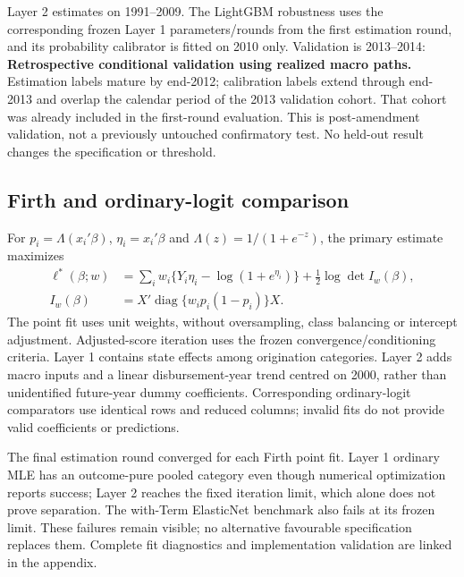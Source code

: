 Layer 2 estimates on 1991--2009. The LightGBM robustness uses the corresponding frozen Layer 1 parameters/rounds from the first estimation round, and its probability calibrator is fitted on 2010 only. Validation is 2013--2014: \textbf{Retrospective conditional validation using realized macro paths.} Estimation labels mature by end-2012; calibration labels extend through end-2013 and overlap the calendar period of the 2013 validation cohort. That cohort was already included in the first-round evaluation. This is post-amendment validation, not a previously untouched confirmatory test. No held-out result changes the specification or threshold.

\subsection{Firth and ordinary-logit comparison}
For $p_i=\Lambda(x_i'\beta)$, $\eta_i=x_i'\beta$ and $\Lambda(z)=1/(1+e^{-z})$, the primary estimate maximizes
\begin{align*}
\ell^*(\beta;w)&=\sum_iw_i\{Y_i\eta_i-\log(1+e^{\eta_i})\}+\tfrac12\log\det I_w(\beta),\\
I_w(\beta)&=X'\operatorname{diag}\{w_ip_i(1-p_i)\}X.
\end{align*}
The point fit uses unit weights, without oversampling, class balancing or intercept adjustment. Adjusted-score iteration uses the frozen convergence/conditioning criteria. Layer 1 contains state effects among origination categories. Layer 2 adds macro inputs and a linear disbursement-year trend centred on 2000, rather than unidentified future-year dummy coefficients. Corresponding ordinary-logit comparators use identical rows and reduced columns; invalid fits do not provide valid coefficients or predictions.

The final estimation round converged for each Firth point fit. Layer 1 ordinary MLE has an outcome-pure pooled category even though numerical optimization reports success; Layer 2 reaches the fixed iteration limit, which alone does not prove separation. The with-Term ElasticNet benchmark also fails at its frozen limit. These failures remain visible; no alternative favourable specification replaces them. Complete fit diagnostics and implementation validation are linked in the appendix.


